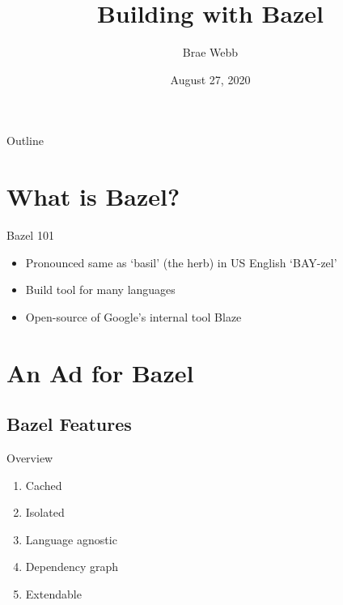 \documentclass[aspectratio=169]{beamer}
\title{Building with Bazel}
\author{Brae Webb}
\institute{University of Queensland}
\date{August 27, 2020}
\begin{document}

\begin{title-slide}
\titlepage
\end{title-slide}

\begin{split-slide}{Outline}
    \vspace{4em}
    \tableofcontents
\end{split-slide}

\section{What is Bazel?}

\begin{body-slide}{Bazel 101}
\begin{itemize}[<+-| alert@+>]
    \color{UQCSBlue}
    \item Pronounced same as `basil' (the herb) in US English `BAY-zel'
    \item Build tool for many languages
    \item Open-source of Google's internal tool Blaze
\end{itemize}

\end{body-slide}

\section{An Ad for Bazel}

\subsection{Bazel Features}
\begin{split-slide}{Overview}
\begin{enumerate}
    \item Cached
    \item Isolated
    \item Language agnostic
    \item Dependency graph
    \item Extendable
\end{enumerate}
\end{split-slide}
\end{document}

